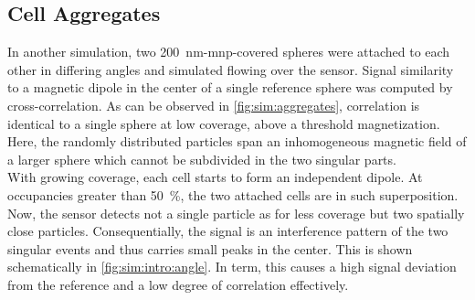 \subsection{Cell Aggregates}
In another simulation, two \SI{200}{\nano\meter}-\gls{mnp}-covered spheres were attached to each other in differing angles and simulated flowing over the sensor. Signal similarity to a magnetic dipole in the center of a single reference sphere was computed by cross-correlation. As can be observed in \cref{fig:sim:aggregates}, correlation is identical to a single sphere at low coverage, above a threshold magnetization. Here, the randomly distributed particles span an inhomogeneous magnetic field of a larger sphere which cannot be subdivided in the two singular parts.\\
With growing coverage, each cell starts to form an independent dipole. At occupancies greater than \SI{50}{\percent}, the two attached cells are in such superposition. Now, the sensor detects not a single particle as for less coverage but two spatially close particles. Consequentially, the signal is an interference pattern of the two singular events and thus carries small peaks in the center. This is shown schematically in \cref{fig:sim:intro:angle}. In term, this causes a high signal deviation from the reference and a low degree of correlation effectively.
\begin{figure}[h!]
	\centering
	 \hfill
	\addtocounter{subfigure}{-1}
	\label{fig:sim:CorrDiff}
\end{figure}

